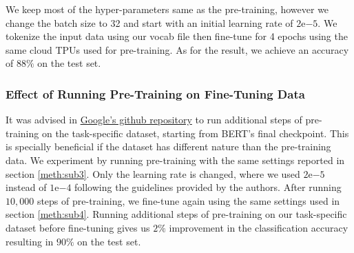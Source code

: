 We keep most of the hyper-parameters same as the pre-training, however we change the batch size to 32 and start with an initial learning rate of $2\mathrm{e}{-5}$. We tokenize the input data using our vocab file then fine-tune for 4 epochs using the same cloud \ac{TPU}s used for pre-training. As for the result, we achieve an accuracy of $88\%$ on the test set.


\subsubsection{Effect of Running Pre-Training on Fine-Tuning Data}

It was advised in \href{https://github.com/google-research/bert#pre-training-tips-and-caveats}{Google's github repository} to run additional steps of pre-training on the task-specific dataset, starting from \ac{BERT}'s final checkpoint. This is specially beneficial if the dataset has different nature than the pre-training data. We experiment by running pre-training with the same settings reported in section \ref{meth:sub3}. Only the learning rate is changed, where we used $2\mathrm{e}{-5}$ instead of $1\mathrm{e}{-4}$ following the guidelines provided by the authors. After running $10,000$ steps of pre-training, we fine-tune again using the same settings used in section \ref{meth:sub4}. Running additional steps of pre-training on our task-specific dataset before fine-tuning gives us $2\%$ improvement in the classification accuracy resulting in $90\%$ on the test set.
